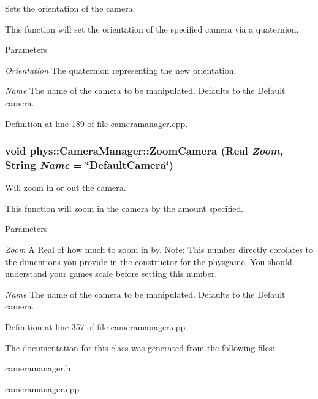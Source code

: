 Sets the orientation of the camera. 

This function will set the orientation of the specified camera via a quaternion. 
\begin{DoxyParams}{Parameters}
\item[{\em Orientation}]The quaternion representing the new orientation. \item[{\em Name}]The name of the camera to be manipulated. Defaults to the Default camera. \end{DoxyParams}


Definition at line 189 of file cameramanager.cpp.

\hypertarget{classphys_1_1CameraManager_aa5a37dbdd45a53bc3dfd4cfa0a94bd42}{
\subsubsection[{ZoomCamera}]{\setlength{\rightskip}{0pt plus 5cm}void phys::CameraManager::ZoomCamera ({\bf Real} {\em Zoom}, \/  {\bf String} {\em Name} = {\ttfamily \char`\"{}DefaultCamera\char`\"{}})}}
\label{d9/d91/classphys_1_1CameraManager_aa5a37dbdd45a53bc3dfd4cfa0a94bd42}


Will zoom in or out the camera. 

This function will zoom in the camera by the amount specified. 
\begin{DoxyParams}{Parameters}
\item[{\em Zoom}]A Real of how much to zoom in by. Note: This number directly corolates to the dimentions you provide in the constructor for the physgame. You should understand your games scale before setting this number. \item[{\em Name}]The name of the camera to be manipulated. Defaults to the Default camera. \end{DoxyParams}


Definition at line 357 of file cameramanager.cpp.



The documentation for this class was generated from the following files:\begin{DoxyCompactItemize}
\item 
cameramanager.h\item 
cameramanager.cpp\end{DoxyCompactItemize}
